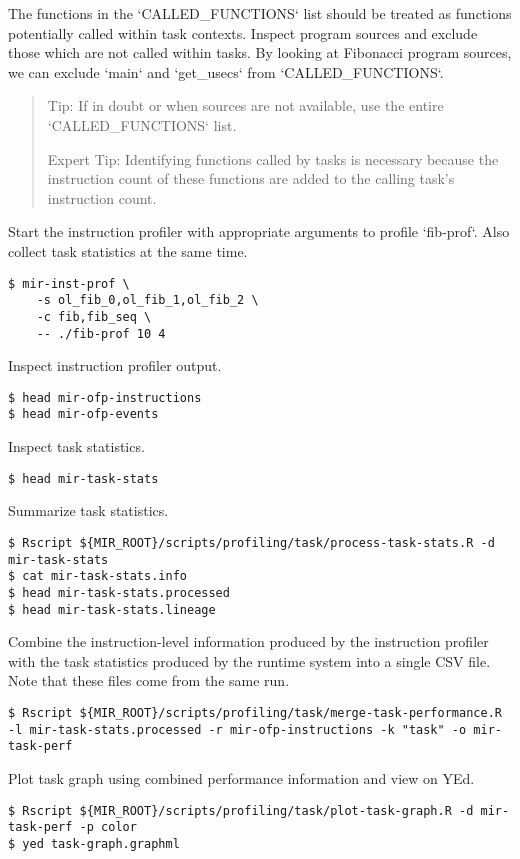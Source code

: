 \documentclass[11pt,a4paper]{article}
\begin{document}
The functions in the `CALLED\_FUNCTIONS` list should be treated as functions potentially called within task contexts.  Inspect program sources and exclude those which are not called within tasks.  By looking at Fibonacci program sources, we can exclude `main` and `get\_usecs` from `CALLED\_FUNCTIONS`. 
    
\begin{framed}
\begin{quote}
Tip: If in doubt or when sources are not available, use the entire `CALLED\_FUNCTIONS` list. 

Expert Tip: Identifying functions called by tasks is necessary because the instruction count of these functions are added to the calling task's instruction count. 
\end{quote}
\end{framed}

Start the instruction profiler with appropriate arguments to profile `fib-prof`.  Also collect task statistics at the same time.

\begin{lstlisting}[style=MyInputStyle]
$ mir-inst-prof \
    -s ol_fib_0,ol_fib_1,ol_fib_2 \
    -c fib,fib_seq \
    -- ./fib-prof 10 4
\end{lstlisting}

Inspect instruction profiler output. 

\begin{lstlisting}[style=MyInputStyle]
$ head mir-ofp-instructions
$ head mir-ofp-events
\end{lstlisting}

Inspect task statistics.

\begin{lstlisting}[style=MyInputStyle]
$ head mir-task-stats
\end{lstlisting}

Summarize task statistics.

\begin{lstlisting}[style=MyInputStyle]
$ Rscript ${MIR_ROOT}/scripts/profiling/task/process-task-stats.R -d mir-task-stats
$ cat mir-task-stats.info
$ head mir-task-stats.processed
$ head mir-task-stats.lineage
\end{lstlisting}

Combine the instruction-level information produced by the instruction profiler with the task statistics produced by the runtime system into a single CSV file. Note that these files come from the same run.

\begin{lstlisting}[style=MyInputStyle]
$ Rscript ${MIR_ROOT}/scripts/profiling/task/merge-task-performance.R -l mir-task-stats.processed -r mir-ofp-instructions -k "task" -o mir-task-perf
\end{lstlisting}

Plot task graph using combined performance information and view on YEd.

\begin{lstlisting}[style=MyInputStyle]
$ Rscript ${MIR_ROOT}/scripts/profiling/task/plot-task-graph.R -d mir-task-perf -p color
$ yed task-graph.graphml
\end{lstlisting}
\end{document}
